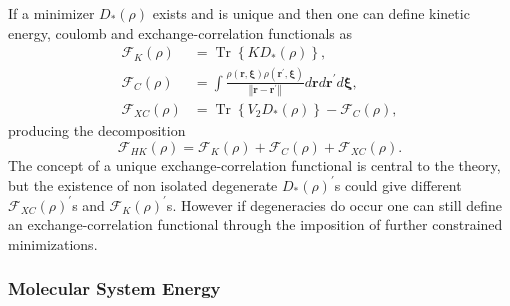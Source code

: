 \documentclass[aps,preprint]{revtex4}%
\begin{document}
If a minimizer $D_{\ast}\left(  \rho\right)  $ exists and is unique and then
one can define kinetic energy, coulomb and exchange-correlation functionals
as
\begin{align}
\mathcal{F}_{K}\left(  \rho\right)   &  =\operatorname{Tr}\left\{  KD_{\ast
}\left(  \rho\right)  \right\}  ,\nonumber\\
\mathcal{F}_{C}\left(  \rho\right)   &  =\int\frac{\rho\left(
\boldsymbol{r,\xi}\right)  \rho\left(  \boldsymbol{r}^{\prime}\boldsymbol{,\xi
}\right)  }{\left\Vert \boldsymbol{r-r}^{\prime}\right\Vert }d\boldsymbol{r}%
d\boldsymbol{r}^{\prime}d\boldsymbol{\xi},\nonumber\\
\mathcal{F}_{XC}\left(  \rho\right)   &  =\operatorname{Tr}\left\{
V_{2}D_{\ast}\left(  \rho\right)  \right\}  -\mathcal{F}_{C}\left(
\rho\right)  ,
\end{align}
producing the decomposition
\begin{equation}
\mathcal{F}_{HK}\left(  \rho\right)  =\mathcal{F}_{K}\left(  \rho\right)
+\mathcal{F}_{C}\left(  \rho\right)  +\mathcal{F}_{XC}\left(  \rho\right)  .
\end{equation}
The concept of a unique exchange-correlation functional is central to the
theory, but the existence of non isolated degenerate $D_{\ast}\left(
\rho\right)  ^{\prime}$s could give different $\mathcal{F}_{XC}\left(
\rho\right)  ^{\prime}$s and $\mathcal{F}_{K}\left(  \rho\right)  ^{\prime}$s.
However if degeneracies do occur one can still define an exchange-correlation
functional through the imposition of further constrained minimizations.

\subsubsection{Molecular System Energy\label{MolSysEn}}
\end{document}
